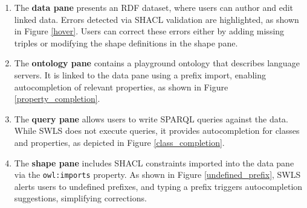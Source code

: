 \begin{enumerate}
  \item The \textbf{data pane} presents an RDF dataset, where users can author and edit linked data. Errors detected via SHACL validation are highlighted, as shown in Figure \ref{hover}. Users can correct these errors either by adding missing triples or modifying the shape definitions in the shape pane.
  \item The \textbf{ontology pane} contains a playground ontology that describes language servers. It is linked to the data pane using a prefix import, enabling autocompletion of relevant properties, as shown in Figure \ref{property_completion}.
  \item The \textbf{query pane} allows users to write SPARQL queries against the data. While SWLS does not execute queries, it provides autocompletion for classes and properties, as depicted in Figure \ref{class_completion}.
  \item The \textbf{shape pane} includes SHACL constraints imported into the data pane via the \texttt{owl:imports} property. As shown in Figure \ref{undefined_prefix}, SWLS alerts users to undefined prefixes, and typing a prefix triggers autocompletion suggestions, simplifying corrections.
\end{enumerate}
%
%
%

